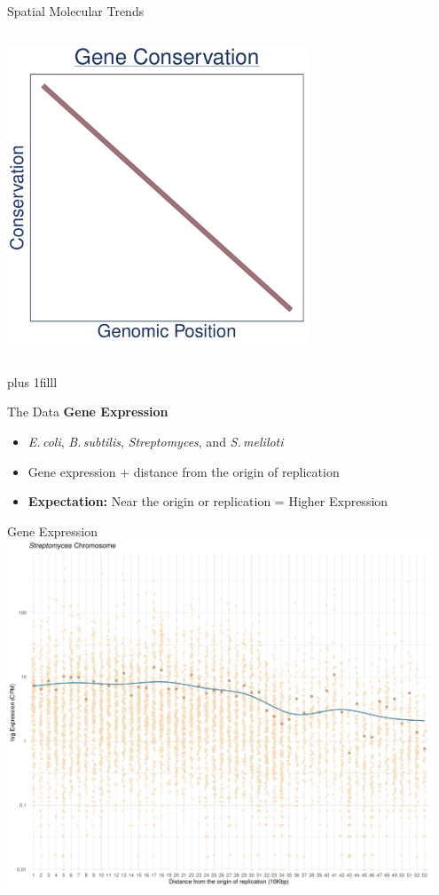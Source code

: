 \documentclass{beamer}
\makeatletter
\newcommand{\bi}{\begin{itemize}}
\newcommand{\ei}{\end{itemize}}
\newcommand{\sourceright}[1]{\begin{textblock*}{}
		\begin{beamercolorbox}[ht=0.5cm,left]{framesource}
			\usebeamerfont{framesource}\usebeamercolor[berry]{framesource}
			{#1}
		\end{beamercolorbox}
	\end{textblock*}}
\newcommand{\itm}{\item<itm@1->}
\newcommand{\btVFill}{\vskip0pt plus 1filll}
\newcommand{\smel}{\textit{S.\,meliloti}\xspace}
\newcommand{\bass}{\textit{B.\,subtilis}\xspace}
\newcommand{\strep}{\textit{Streptomyces}\xspace}
\newcommand{\ecol}{\textit{E.\,coli}\xspace}
\makeatother
\begin{document}
\begin{frame}{Spatial Molecular Trends}
\begin{columns}[t]
		\includegraphics[width=0.67\textwidth]{./cons_graph.pdf}
	\end{columns}
	
	\btVFill
	\tiny \vspace{-\baselineskip}\color{berry}{Couturier et al. 2006, Cooper et al. 2010, Sharp et al. 2005, Morrow et al. 2012, Cooper and Rocha 2006}
	
\end{frame}
\begin{frame}[t]{The Data}
	\textbf{Gene Expression}
	\bi
	\itm \ecol, \bass, \strep, and \smel
	\itm Gene expression + distance from the origin of replication
	\itm \textbf{Expectation:} Near the origin or replication = Higher Expression
	\ei
	
\end{frame}
\begin{frame}{Gene Expression}
	\centering
	\includegraphics[width=0.95\textwidth]{strep_expression_plot.pdf}
\end{frame}
\end{document}
